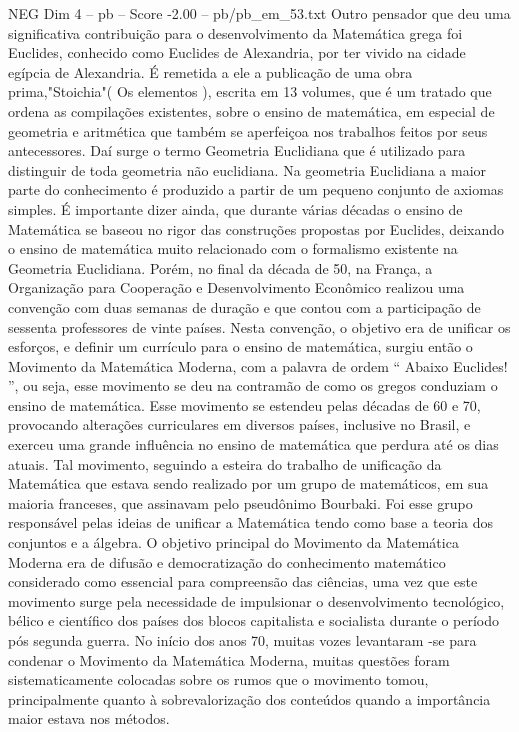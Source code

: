 \begin{textsample}{NEG Dim 4 – pb – Score -2.00 – pb/pb\_em\_53.txt}
Outro pensador que deu uma significativa contribuição para o desenvolvimento da Matemática grega foi Euclides, conhecido como Euclides de Alexandria, por ter vivido na cidade egípcia de Alexandria.
É remetida a ele a publicação de uma obra prima,"Stoichia"( Os elementos ), escrita em 13 volumes, que é um tratado que ordena as compilações existentes, sobre o ensino de matemática, em especial de geometria e aritmética que também se aperfeiçoa nos trabalhos feitos por seus antecessores.
Daí surge o termo Geometria Euclidiana que é utilizado para distinguir de toda geometria não euclidiana.
Na geometria Euclidiana a maior parte do conhecimento é produzido a partir de um pequeno conjunto de axiomas simples.
É importante dizer ainda, que durante várias décadas o ensino de Matemática se baseou no rigor das construções propostas por Euclides, deixando o ensino de matemática muito relacionado com o formalismo existente na Geometria Euclidiana.
Porém, no final da década de 50, na França, a Organização para Cooperação e Desenvolvimento Econômico realizou uma convenção com duas semanas de duração e que contou com a participação de sessenta professores de vinte países.
Nesta convenção, o objetivo era de unificar os esforços, e definir um currículo para o ensino de matemática, surgiu então o Movimento da Matemática Moderna, com a palavra de ordem “ Abaixo Euclides! ”, ou seja, esse movimento se deu na contramão de como os gregos conduziam o ensino de matemática.
Esse movimento se estendeu pelas décadas de 60 e 70, provocando alterações curriculares em diversos países, inclusive no Brasil, e exerceu uma grande influência no ensino de matemática que perdura até os dias atuais.
Tal movimento, seguindo a esteira do trabalho de unificação da Matemática que estava sendo realizado por um grupo de matemáticos, em sua maioria franceses, que assinavam pelo pseudônimo Bourbaki.
Foi esse grupo responsável pelas ideias de unificar a Matemática tendo como base a teoria dos conjuntos e a álgebra.
O objetivo principal do Movimento da Matemática Moderna era de difusão e democratização do conhecimento matemático considerado como essencial para compreensão das ciências, uma vez que este movimento surge pela necessidade de impulsionar o desenvolvimento tecnológico, bélico e científico dos países dos blocos capitalista e socialista durante o período pós segunda guerra.
No início dos anos 70, muitas vozes levantaram -se para condenar o Movimento da Matemática Moderna, muitas questões foram sistematicamente colocadas sobre os rumos que o movimento tomou, principalmente quanto à sobrevalorização dos conteúdos quando a importância maior estava nos métodos.

\end{textsample}

